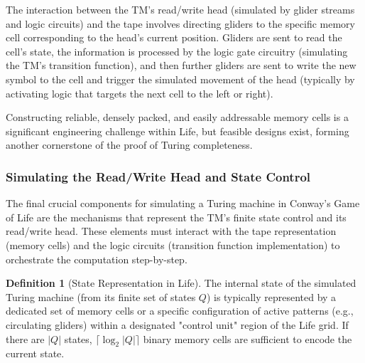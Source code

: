 \documentclass{article}
\theoremstyle{definition}
\newtheorem{definition}{Definition}[section]
\theoremstyle{plain}
\theoremstyle{plain}
\begin{document}
The interaction between the TM's read/write head (simulated by glider streams and logic circuits) and the tape involves directing gliders to the specific memory cell corresponding to the head's current position. Gliders are sent to read the cell's state, the information is processed by the logic gate circuitry (simulating the TM's transition function), and then further gliders are sent to write the new symbol to the cell and trigger the simulated movement of the head (typically by activating logic that targets the next cell to the left or right).

Constructing reliable, densely packed, and easily addressable memory cells is a significant engineering challenge within Life, but feasible designs exist, forming another cornerstone of the proof of Turing completeness.

\subsubsection{Simulating the Read/Write Head and State Control}

The final crucial components for simulating a Turing machine in Conway's Game of Life are the mechanisms that represent the TM's finite state control and its read/write head. These elements must interact with the tape representation (memory cells) and the logic circuits (transition function implementation) to orchestrate the computation step-by-step.

\begin{definition}[State Representation in Life]
The internal state of the simulated Turing machine (from its finite set of states $Q$) is typically represented by a dedicated set of memory cells or a specific configuration of active patterns (e.g., circulating gliders) within a designated "control unit" region of the Life grid. If there are $|Q|$ states, $\lceil \log_2 |Q| \rceil$ binary memory cells are sufficient to encode the current state.
\end{definition}
\end{document}
